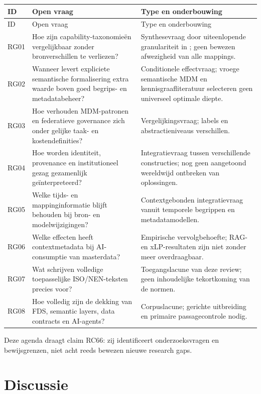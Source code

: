 \begin{longtable}{@{}P{.08\linewidth}P{.37\linewidth}P{.47\linewidth}@{}}
\toprule ID & Open vraag & Type en onderbouwing \\\midrule\endfirsthead
\toprule ID & Open vraag & Type en onderbouwing \\\midrule\endhead
RG01 & Hoe zijn capability-taxonomieën vergelijkbaar zonder bronverschillen te verliezen? & Synthesevraag door uiteenlopende granulariteit in \textcite{L20,L05,P01}; geen bewezen afwezigheid van alle mappings. \\
RG02 & Wanneer levert expliciete semantische formalisering extra waarde boven goed begrips- en metadatabeheer? & Conditionele effectvraag; vroege semantische MDM en kennisgraafliteratuur selecteren geen universeel optimale diepte. \parencite{L18,L13} \\
RG03 & Hoe verhouden MDM-patronen en federatieve governance zich onder gelijke taak- en kostendefinities? & Vergelijkingsvraag; labels en abstractieniveaus verschillen. \parencite{L20,L23,L24} \\
RG04 & Hoe worden identiteit, provenance en institutioneel gezag gezamenlijk geïnterpreteerd? & Integratievraag tussen verschillende constructies; nog geen aangetoond wereldwijd ontbreken van oplossingen. \parencite{L21,S33,S25} \\
RG05 & Welke tijds- en mappinginformatie blijft behouden bij bron- en modelwijzigingen? & Contextgebonden integratievraag vanuit temporele begrippen en metadatamodellen. \parencite{L14,S08,S13} \\
RG06 & Welke effecten heeft contextmetadata bij AI-consumptie van masterdata? & Empirische vervolgbehoefte; RAG- en xLP-resultaten zijn niet zonder meer overdraagbaar. \parencite{L16,L31} \\
RG07 & Wat schrijven volledige toepasselijke ISO/NEN-teksten precies voor? & Toegangslacune van deze review; geen inhoudelijke tekortkoming van de normen. \\
RG08 & Hoe volledig zijn de dekking van FDS, semantic layers, data contracts en AI-agents? & Corpuslacune; gerichte uitbreiding en primaire passagecontrole nodig. \\
\bottomrule
\end{longtable}
Deze agenda draagt claim RC66: zij identificeert onderzoeksvragen en bewijsgrenzen, niet acht reeds bewezen nieuwe research gaps.

\section{Discussie}
